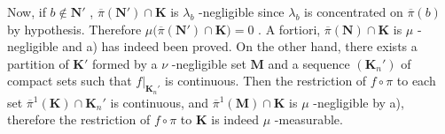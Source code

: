 Now, if \(b \notin \mathbf{N}'\) , \(\overline{\pi}(\mathbf{N}') \cap \mathbf{K}\) is \(\lambda_b\) -negligible since \(\lambda_b\) is concentrated on \(\overline{\pi}(b)\) by hypothesis. Therefore \(\mu\big(\overline{\pi}(\mathbf{N}') \cap \mathbf{K}\big) = 0\) . A fortiori, \(\overline{\pi}(\mathbf{N}) \cap \mathbf{K}\) is \(\mu\) -negligible and a) has indeed been proved. On the other hand, there exists a partition of \(\mathbf{K}'\) formed by a \(\nu\) -negligible set \(\mathbf{M}\) and a sequence \((\mathbf{K}_n')\) of compact sets such that \(f|_{\mathbf{K}_n'}\) is continuous. Then the restriction of \(f \circ \pi\) to each set \(\overline{\pi}^1(\mathbf{K}) \cap \mathbf{K}_n'\) is continuous, and \(\overline{\pi}^1(\mathbf{M}) \cap \mathbf{K}\) is \(\mu\) -negligible by a), therefore the restriction of \(f \circ \pi\) to \(\mathbf{K}\) is indeed \(\mu\) -measurable.

